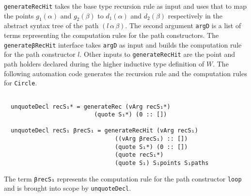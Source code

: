 \documentclass[sigplan,10pt]{acmart}
\begin{document}
{\tt generateRecHit} takes the base type recursion rule as input and uses that to map the points $g_1 (\alpha)$ and $g_2 (\beta)$ to $d_1 (\alpha)$ and $d_2 (\beta)$ respectively in the abstract syntax tree of the path $(l \, \alpha \, \beta)$. The second argument {\tt argD} is a list of terms representing the computation rules for the path constructors. The {\tt generateβRecHit} interface takes {\tt argD} as input and builds the computation rule for the path constructor $l$. Other inputs to {\tt generateRecHit} are the point and path holders declared during the higher inductive type definition of $W$. The following automation code generates the recursion rule and the computation rules for {\tt Circle}.

\begin{center}
\begingroup
\fontsize{8pt}{9pt}\selectfont
\begin{Verbatim}

  unquoteDecl recS₁* = generateRec (vArg recS₁*)
                          (quote S₁*) (0 :: [])

  unquoteDecl recS₁ βrecS₁ = generateRecHit (vArg recS₁) 
                                ((vArg βrecS₁) :: [])
                                (quote S₁*) (0 :: [])
                                (quote recS₁*)
                                (quote S₁) S₁points S₁paths

\end{Verbatim}
\endgroup
\end{center}

The term {\tt βrecS₁} represents the computation rule for the path constructor {\tt loop} and is brought into scope by {\tt unquoteDecl}.


 
\end{document}

